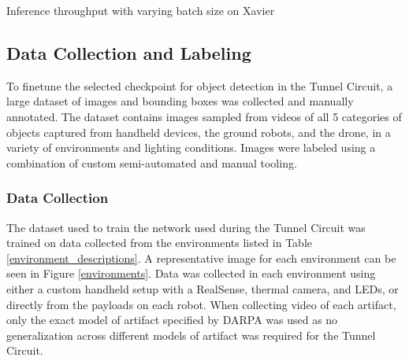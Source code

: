 \begin{table}
	\centering
	\begin{adjustbox}{max width=.9\textwidth}
	\end{adjustbox}
	\caption{Inference throughput with varying batch size on Xavier}
	\label{batch_size_graphs}
\end{table}

\subsection{Data Collection and Labeling}

To finetune the selected checkpoint for object detection in the Tunnel Circuit, a large dataset of images and bounding boxes was collected and manually annotated. The dataset contains images sampled from videos of all 5 categories of objects captured from handheld devices, the ground robots, and the drone, in a variety of environments and lighting conditions. Images were labeled using a combination of custom semi-automated and manual tooling.

\subsubsection{Data Collection}

The dataset used to train the network used during the Tunnel Circuit was trained on data collected from the environments listed in Table \ref{environment_descriptions}. A representative image for each environment can be seen in Figure \ref{environments}. Data was collected in each environment using either a custom handheld setup with a RealSense, thermal camera, and LEDs, or directly from the payloads on each robot. When collecting video of each artifact, only the exact model of artifact specified by DARPA was used as no generalization across different models of artifact was required for the Tunnel Circuit.


